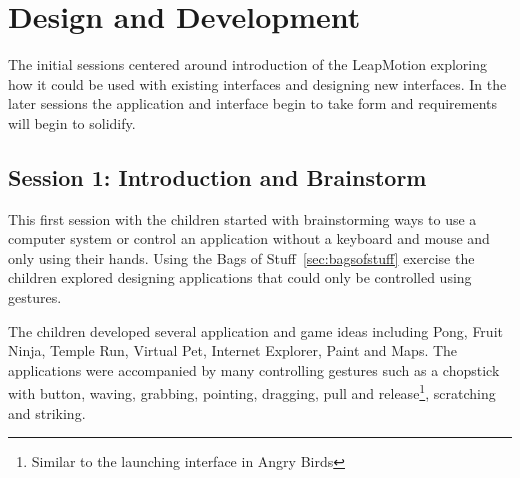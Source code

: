 
\chapter{Design and Development} %

\label{Chapter3} %





The initial sessions centered around introduction of the LeapMotion exploring how it could be used with existing interfaces and designing new interfaces. In the later sessions the application and interface begin to take form and requirements will begin to solidify. 


\section{Session 1: Introduction and Brainstorm}\label{session1}

This first session with the children started with brainstorming ways to use a computer system or control an application without a keyboard and mouse and only using their hands. Using the Bags of Stuff~\ref{sec:bagsofstuff} exercise the children explored designing applications that could only be controlled using gestures.

The children developed several application and game ideas including Pong, Fruit Ninja, Temple Run, Virtual Pet, Internet Explorer, Paint and Maps. The applications were accompanied by many controlling gestures such as a chopstick with button, waving, grabbing, pointing, dragging, pull and release\footnote{Similar to the launching interface in Angry Birds}, scratching and striking. 

